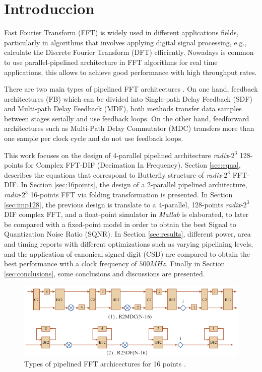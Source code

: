 \documentclass[10pt,times,mathptm,psfig,final,journal,comsoc]{IEEEtran}
\begin{document}
\section{Introduccion}
 Fast Fourier Transform (FFT) is widely used in different applications fields, particularly in algorithms that involves applying digital signal processing, e.g., calculate the Discrete Fourier Transform (DFT) efficiently. Nowadays is common to use parallel-pipelined architecture in FFT algorithms for real time applications, this allows to achieve good performance with high throughput rates.

There are two main types of pipelined FFT architectures  \cite{shousheng_he_designing_1998}. On one hand, feedback architectures (FB) which can be divided into Single-path Delay Feedback (SDF) and Multi-path Delay Feedback (MDF), both methods transfer data samples between stages serially and use feedback loops. On the other hand, feedforward architectures such as Multi-Path Delay Commutator (MDC) transfers more than one sample per clock cycle and do not use feedback loops.

This work focuses on the design of 4-parallel pipelined architecture \textit{radix}-$2^3$ 128-points for Complex FFT-DIF (Decimation In Frequency). Section \ref{sec:equa}, describes the equations that correspond to Butterfly structure of \textit{radix}-$2^3$ FFT-DIF. In Section \ref{sec:16points}, the design of a 2-parallel pipelined architecture, \textit{radix}-$2^3$ 16-points FFT via folding transformation is presented. In Section \ref{sec:imp128}, the previous design is translate to a 4-parallel, 128-points \textit{radix}-$2^3$ DIF complex FFT, and a float-point simulator in \textit{Matlab} is elaborated, to later be compared with a fixed-point model in order to obtain the best Signal to Quantization Noise Ratio (SQNR).
In Section \ref{sec:results}, different power, area and timing reports with different optimizations such as varying pipelining levels, and the application of canonical signed digit (CSD) are compared to obtain the best performance with a clock frequency of $500MHz$. Finally in Section \ref{sec:conclusions}, some conclusions and discussions are presented.  

\begin{figure} 
	\centering
	\includegraphics[width=1\linewidth]{Diagramas/types_FFT.png}
	\caption{Types of pipelined FFT archicectures for 16 points \cite{type_FFT_MIT}.}
	\label{fig:types_fft}
\end{figure}
\end{document}
